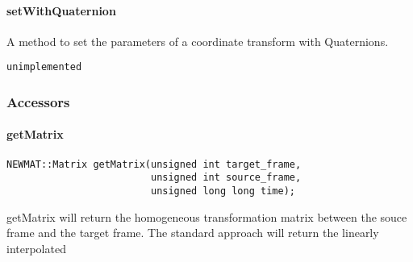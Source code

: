 \documentclass[12pt]{article}
\begin{document}
\paragraph{setWithQuaternion}
A method to set the parameters of a coordinate transform with Quaternions. 
\begin{verbatim}
unimplemented
\end{verbatim}


\subsubsection{Accessors}
\label{libTFAPI accessors}
\paragraph{getMatrix}
\begin{verbatim}
NEWMAT::Matrix getMatrix(unsigned int target_frame,
                         unsigned int source_frame,
                         unsigned long long time); 
\end{verbatim}
getMatrix will return the homogeneous transformation matrix between the souce frame and the target frame.  
The standard approach will return the linearly interpolated 
\end{document}
